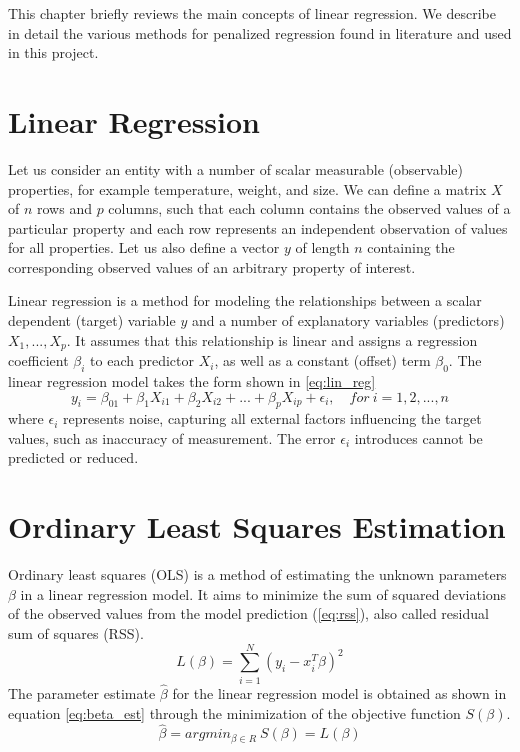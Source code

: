 This chapter briefly reviews the main concepts of linear regression. We describe in detail the various methods for penalized regression found in literature and used in this project.


\section{Linear Regression}
Let us consider an entity with a number of scalar measurable (observable) properties, for example temperature, weight, and size. We can define a matrix $X$ of $n$ rows and $p$ columns, such that each column contains the observed values of a particular property and each row represents an independent observation of values for all properties. Let us also define a vector $y$ of length $n$ containing the corresponding observed values of an arbitrary property of interest.

Linear regression is a method for modeling the relationships between a scalar dependent (target) variable $y$ and a number of explanatory variables (predictors) $X_1,...,X_p$. It assumes that this relationship is linear and assigns a regression coefficient $\beta_i$ to each predictor $X_i$, as well as a constant (offset) term $\beta_0$. The linear regression model takes the form shown in \ref{eq:lin_reg}
\begin{equation} \label{eq:lin_reg}
y_i = \beta_01+\beta_1X_{i1}+\beta_2X_{i2}+...+\beta_pX_{ip}+\epsilon_i, \quad for\ i=1,2,...,n
\end{equation}
where $\epsilon_i$ represents noise, capturing all external factors influencing the target values, such as inaccuracy of measurement. The error $\epsilon_i$ introduces cannot be predicted or reduced.


\section{Ordinary Least Squares Estimation}
Ordinary least squares (OLS) is a method of estimating the unknown parameters $\beta$ in a linear regression model. It aims to minimize the sum of squared deviations of the observed values from the model prediction (\ref{eq:rss}), also called residual sum of squares (RSS).
\begin{equation} \label{eq:rss}
L(\beta) = \sum_{i=1}^{N} (y_i - x_i^T\beta)^2
\end{equation}
The parameter estimate $\hat{\beta}$ for the linear regression model is obtained as shown in equation \ref{eq:beta_est} through the minimization of the objective function $S(\beta)$.
\begin{equation} \label{eq:beta_est}
\hat{\beta} = argmin_{\beta \in R}\ S(\beta) = L(\beta)
\end{equation}


